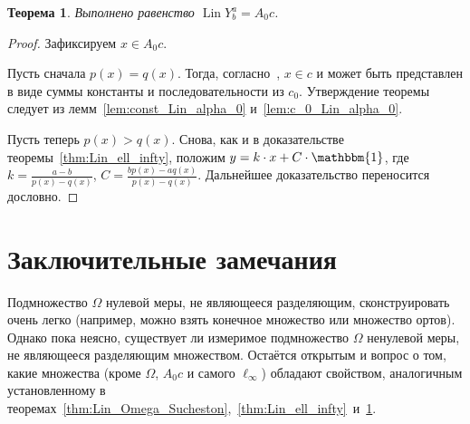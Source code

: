 \documentclass[a4paper,14pt]{article} %
\theoremstyle{plain}
\newtheorem{theorem}[lemma]{Теорема}
\begin{document}
\begin{theorem}
	\label{thm:A_0_c_infty_lin}
	Выполнено равенство $\operatorname{Lin} Y^a_b = A_0 c$.
\end{theorem}

\begin{proof}
	Зафиксируем $x \in A_0 c$.

	Пусть сначала $p(x) = q(x)$.
	Тогда, согласно~\cite[следствие 2]{our-mz2019ac0}, $x\in c$
	и может быть представлен в виде суммы константы и последовательности из $c_0$.
	Утверждение теоремы следует из лемм~\ref{lem:const_Lin_alpha_0} и~\ref{lem:c_0_Lin_alpha_0}.

	Пусть теперь $p(x) > q(x)$.
	Снова, как и в доказательстве теоремы~\ref{thm:Lin_ell_infty},
	положим $y=k\cdot x + C\cdot\mathbbm{1}$,
	где $k=\frac{a-b}{p(x)-q(x)}$, $C=\frac{bp(x)-aq(x)}{p(x)-q(x)}$.
	Дальнейшее доказательство переносится дословно.
\end{proof}



\section{Заключительные замечания}
Подмножество $\Omega$ нулевой меры, не являющееся разделяющим, сконструировать очень легко
(например, можно взять конечное множество или множество ортов).
Однако пока неясно, существует ли измеримое подмножество $\Omega$ ненулевой меры,
не являющееся разделяющим множеством.
Остаётся открытым и вопрос о том, какие множества (кроме $\Omega$, $A_0 c$ и самого $\ell_\infty$)
обладают свойством, аналогичным установленному в теоремах~\ref{thm:Lin_Omega_Sucheston},~\ref{thm:Lin_ell_infty}~и~\ref{thm:A_0_c_infty_lin}.


\printbibliography
\end{document}
